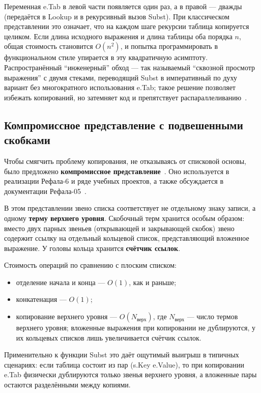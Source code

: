 \documentclass[14pt, russian]{scrartcl}
\renewcommand{\emph}[1]{#1}
\newcommand{\enq}[1]{\enquote{#1}}
\newcommand{\prog}[1]{{\ttfamily\small#1}}
\begin{document}
Переменная \prog{e.Tab} в левой части появляется один раз, а в правой ---
дважды (передаётся в \prog{Lookup} и в рекурсивный вызов \prog{Subst}).
При классическом представлении это означает, что на каждом шаге рекурсии
таблица копируется целиком. Если длина исходного выражения и длина
таблицы оба порядка \(n\), общая стоимость становится \(O(n^2)\), и
попытка программировать в функциональном стиле упирается в эту
квадратичную асимптоту. Распространённый \enq{инженерный} обход --- так
называемый \enq{сквозной просмотр выражения} с двумя стеками, переводящий
\prog{Subst} в императивный по духу вариант без многократного
использования \prog{e.Tab}; такое решение позволяет избежать копирований,
но затемняет код и препятствует распараллеливанию~\cite{abramov_romanenko_1988}.

\subsection{Компромиссное представление с подвешенными скобками}
\label{sec:hanging-list}

Чтобы смягчить проблему копирования, не отказываясь от списковой основы,
было предложено \textbf{компромиссное представление}~\cite{skorobogatov_repr}.
Оно используется в реализации Рефала-6 и ряде учебных проектов, а также
обсуждается в документации Рефала-05~\cite{refal05_site}.

В этом представлении звено списка соответствует не отдельному знаку
записи, а одному \textbf{терму верхнего уровня}. Скобочный терм хранится
особым образом: вместо двух парных звеньев (открывающей и закрывающей
скобок) звено содержит ссылку на отдельный кольцевой список, представляющий
вложенное выражение. У головы кольца хранится \textbf{счётчик ссылок}.

Стоимость операций по сравнению с плоским списком:

\begin{itemize}
  \item отделение начала и конца --- \(O(1)\), как и раньше;
  \item конкатенация --- \(O(1)\);
  \item копирование верхнего уровня --- \(O(N_{\text{верх}})\),
        где \(N_{\text{верх}}\) --- число термов верхнего уровня;
        вложенные выражения при копировании \emph{не дублируются}, у их
        кольцевых списков лишь увеличивается счётчик ссылок.
\end{itemize}

Применительно к функции \prog{Subst} это даёт ощутимый выигрыш в
типичных сценариях: если таблица состоит из пар \prog{(s.Key e.Value)},
то при копировании \prog{e.Tab} физически дублируются только звенья
верхнего уровня, а вложенные пары остаются разделёнными между копиями.
\end{document}

